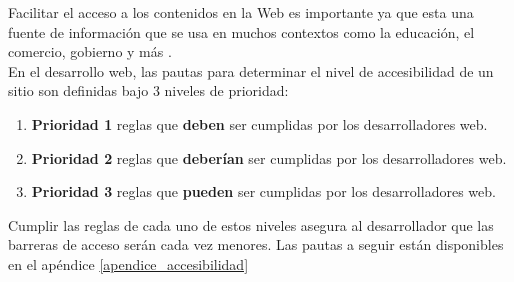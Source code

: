 Facilitar el acceso a los contenidos en la Web es importante ya que esta una fuente de información que se usa en muchos contextos como la educación, el comercio, gobierno y más \citep{Accesibilidad_IntroW3C2005}.\\

En el desarrollo web, las pautas para determinar el nivel de accesibilidad de un sitio son definidas bajo 3 niveles de prioridad:
\begin{enumerate}
 \item \textbf{Prioridad 1} reglas que \textbf{deben} ser cumplidas por los desarrolladores web.
 \item \textbf{Prioridad 2} reglas que \textbf{deberían} ser cumplidas por los desarrolladores web.
 \item \textbf{Prioridad 3} reglas que \textbf{pueden} ser cumplidas por los desarrolladores web.
\end{enumerate}

Cumplir las reglas de cada uno de estos niveles asegura al desarrollador que las barreras de acceso serán cada vez menores. Las pautas a seguir están disponibles en el apéndice \ref{apendice_accesibilidad}